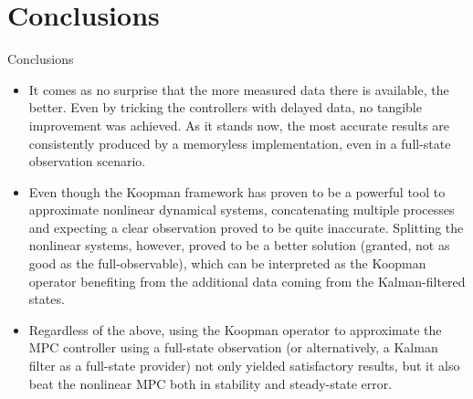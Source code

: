 \documentclass{beamer}
\begin{document}
\section{Conclusions}

\begin{frame}[allowframebreaks]{Conclusions}
    \begin{itemize}
        \item It comes as no surprise that the more measured data there is available, the better. Even by tricking the controllers with delayed data, no tangible improvement was achieved. As it stands now, the most accurate results are consistently produced by a memoryless implementation, even in a full-state observation scenario.
        \item Even though the Koopman framework has proven to be a powerful tool to approximate nonlinear dynamical systems, concatenating multiple processes and expecting a clear observation proved to be quite inaccurate. Splitting the nonlinear systems, however, proved to be a better solution (granted, not as good as the full-observable), which can be interpreted as the Koopman operator benefiting from the additional data coming from the Kalman-filtered states.
        \item Regardless of the above, using the Koopman operator to approximate the MPC controller using a full-state observation (or alternatively, a Kalman filter as a full-state provider) not only yielded satisfactory results, but it also beat the nonlinear MPC both in stability and steady-state error.
    \end{itemize}
\end{frame}
\end{document}

